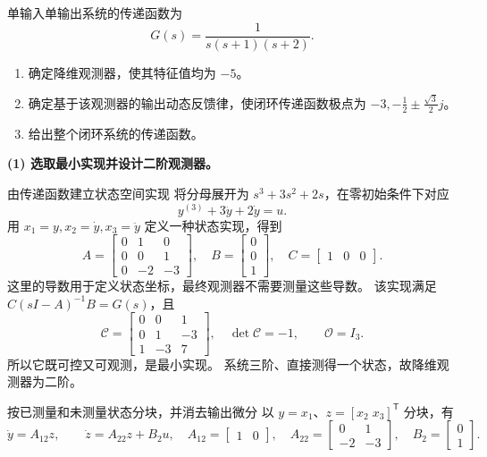 \documentclass[11pt]{article}
\begin{document}
\begin{problem}[原题 6]
单输入单输出系统的传递函数为
\[
 G(s)=\frac1{s(s+1)(s+2)}.
\]
\begin{enumerate}
 \item 确定降维观测器，使其特征值均为 $-5$。
 \item 确定基于该观测器的输出动态反馈律，使闭环传递函数极点为
 $-3,-\tfrac12\pm\tfrac{\sqrt3}{2}j$。
 \item 给出整个闭环系统的传递函数。
\end{enumerate}
\end{problem}
\begin{solution}
\textbf{(1) 选取最小实现并设计二阶观测器。}
\begin{proofstep}{由传递函数建立状态空间实现}
将分母展开为 $s^3+3s^2+2s$，在零初始条件下对应
\[
 y^{(3)}+3\ddot y+2\dot y=u.
\]
用 $x_1=y,x_2=\dot y,x_3=\ddot y$ 定义一种状态实现，得到
\[
 A=\begin{bmatrix}0&1&0\\0&0&1\\0&-2&-3\end{bmatrix},\quad
 B=\begin{bmatrix}0\\0\\1\end{bmatrix},\quad
 C=\begin{bmatrix}1&0&0\end{bmatrix}.
\]
这里的导数用于定义状态坐标，最终观测器不需要测量这些导数。
该实现满足 $C(sI-A)^{-1}B=G(s)$，且
\[
 \mathcal C=\begin{bmatrix}0&0&1\\0&1&-3\\1&-3&7\end{bmatrix},
 \quad\det\mathcal C=-1,\qquad\mathcal O=I_3.
\]
所以它既可控又可观测，是最小实现。
系统三阶、直接测得一个状态，故降维观测器为二阶。
\end{proofstep}
\begin{proofstep}{按已测量和未测量状态分块，并消去输出微分}
以 $y=x_1$、$z=[x_2\;x_3]^{\mathsf T}$ 分块，有
\[
 \dot y=A_{12}z,\qquad \dot z=A_{22}z+B_2u,
 \quad A_{12}=\begin{bmatrix}1&0\end{bmatrix},\quad
 A_{22}=\begin{bmatrix}0&1\\-2&-3\end{bmatrix},\quad
 B_2=\begin{bmatrix}0\\1\end{bmatrix}.
\]
\end{proofstep}
\end{solution}
\end{document}
